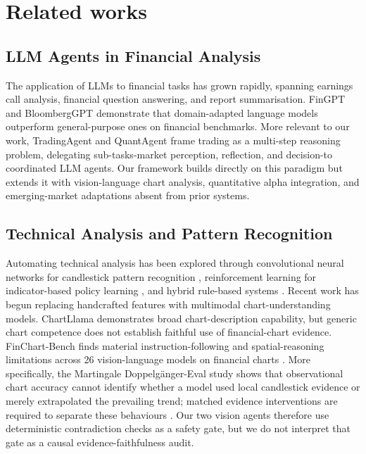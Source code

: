 \section{Related works}
\label{sec:relatedworks}
\subsection{LLM Agents in Financial Analysis}

The application of LLMs to financial tasks has grown rapidly, spanning earnings call analysis, financial question answering, and report summarisation. FinGPT \cite{yang2023fingpt} and BloombergGPT \cite{wu2023bloomberggpt} demonstrate that domain-adapted language models outperform general-purpose ones on financial benchmarks. More relevant to our work, TradingAgent \cite{tradingagents2024} and QuantAgent frame trading as a multi-step reasoning problem, delegating sub-tasks-market perception, reflection, and decision-to coordinated LLM agents. Our framework builds directly on this paradigm but extends it with vision-language chart analysis, quantitative alpha integration, and emerging-market adaptations absent from prior systems.

\subsection{Technical Analysis and Pattern Recognition}

Automating technical analysis has been explored through convolutional neural networks for candlestick pattern recognition \cite{tsantekidis2017candlestick}, reinforcement learning for indicator-based policy learning \cite{deng2016rltrading}, and hybrid rule-based systems \cite{lo2000technical}. Recent work has begun replacing handcrafted features with multimodal chart-understanding models. ChartLlama \cite{han2023chartllama} demonstrates broad chart-description capability, but generic chart competence does not establish faithful use of financial-chart evidence. FinChart-Bench finds material instruction-following and spatial-reasoning limitations across 26 vision-language models on financial charts \cite{shu2026finchart}. More specifically, the Martingale Doppelg\"anger-Eval study shows that observational chart accuracy cannot identify whether a model used local candlestick evidence or merely extrapolated the prevailing trend; matched evidence interventions are required to separate these behaviours \cite{wang2026martingale}. Our two vision agents therefore use deterministic contradiction checks as a safety gate, but we do not interpret that gate as a causal evidence-faithfulness audit.

